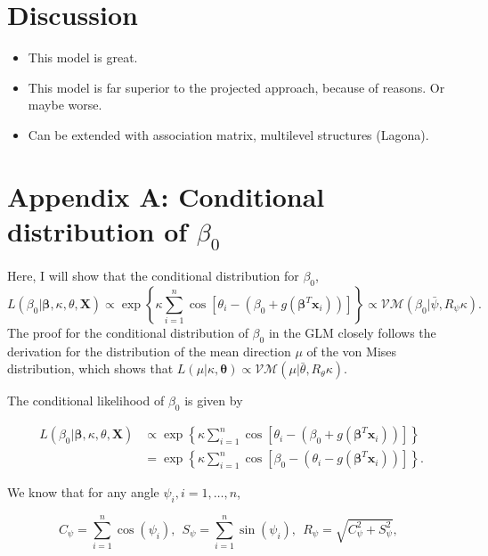 \documentclass[12pt,a4paper]{article}\usepackage[]{graphicx}\usepackage[]{color}
\begin{document}
\section{Discussion}

\begin{itemize}
\item This model is great.
\item This model is far superior to the projected approach, because of reasons. Or maybe worse.
\item Can be extended with association matrix, multilevel structures (Lagona).
\end{itemize}









\section*{Appendix A: Conditional distribution of $\beta_0$} \label{beta0}

Here, I will show that the conditional distribution for $\beta_0$,
$$ L(\beta_0 \vert \boldsymbol\beta, \kappa, \theta, \boldsymbol{X}) \propto \exp \left\lbrace \kappa \sum_{i=1}^n \cos \left[ \theta_i - (\beta_0 + g(\boldsymbol\beta^T \boldsymbol{x}_i)) \right]  \right\rbrace \propto \mathcal{VM}(\beta_0 \vert \bar\psi, R_{\psi}\kappa). $$
The proof for the conditional distribution of $\beta_0$ in the GLM closely follows the derivation for the distribution of the mean direction $\mu$ of the von Mises distribution, which shows that $L(\mu \vert \kappa, \boldsymbol\theta) \propto \mathcal{VM}(\mu \vert \bar\theta, R_{\theta} \kappa)$.

The conditional likelihood of $\beta_0$ is given by

\begin{align*}
L(\beta_0 \vert \boldsymbol\beta, \kappa, \theta, \boldsymbol{X}) & \propto \exp \left\lbrace \kappa \sum_{i=1}^n \cos \left[ \theta_i - (\beta_0 + g(\boldsymbol\beta^T \boldsymbol{x}_i)) \right] \right\rbrace \\
& = \exp \left\lbrace \kappa \sum_{i=1}^n \cos \left[ \beta_0 - (\theta_i - g(\boldsymbol\beta^T \boldsymbol{x}_i)) \right]  \right\rbrace.
\end{align*}

We know that for any angle $\psi_i, i = 1, \dots, n$,

$$ C_{\psi} = \sum_{i=1}^n \cos(\psi_i), ~~ S_{\psi} = \sum_{i=1}^n \sin(\psi_i), ~~ R_{\psi} = \sqrt{C_{\psi}^2 + S_{\psi}^2}, ~~ $$
\end{document}
